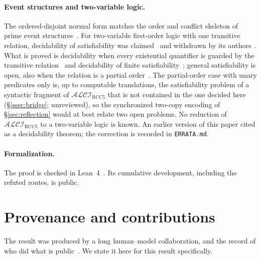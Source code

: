 \documentclass[11pt]{article}
\newcommand{\ALCIRCC}[1]{\mathcal{ALCI}_{\mathrm{RCC#1}}}
\theoremstyle{plain}
\theoremstyle{definition}
\begin{document}
\paragraph{Event structures and two-variable logic.} The ordered-disjoint normal
form matches the order and conflict skeleton of prime event
structures~\cite{NielsenPlotkinWinskel1981}. For two-variable first-order logic
with one transitive relation, decidability of satisfiability was
claimed~\cite{SzwastTendera2013} and withdrawn by its
authors~\cite{SzwastTendera2018}. What is proved is decidability when every
existential quantifier is guarded by the transitive
relation~\cite{SzwastTendera2018} and decidability of finite
satisfiability~\cite{PrattHartmann2018}; general satisfiability is open, also
when the relation is a partial order~\cite{MarzecTendera2026}. The
partial-order case with unary predicates only is, up to computable
translations, the satisfiability problem of a syntactic fragment of
$\ALCIRCC{5}$ that is not contained in the one decided here
(\S\ref{ssec:bridge}; unreviewed), so the synchronized two-copy encoding of
\S\ref{sec:reflection} would at best relate two open problems. No reduction of
$\ALCIRCC{5}$ to a two-variable logic is known. An earlier version of this
paper cited \cite{SzwastTendera2013} as a decidability theorem; the correction
is recorded in \texttt{ERRATA.md}.

\paragraph{Formalization.} The proof is checked in Lean~4~\cite{Lean4}. Its
cumulative development, including the refuted routes, is public.

\section{Provenance and contributions}
\label{sec:provenance}

The result was produced by a long human--model collaboration, and the record of
who did what is public~\cite{ConversationLog}. We state it here for this result
specifically.
\end{document}
